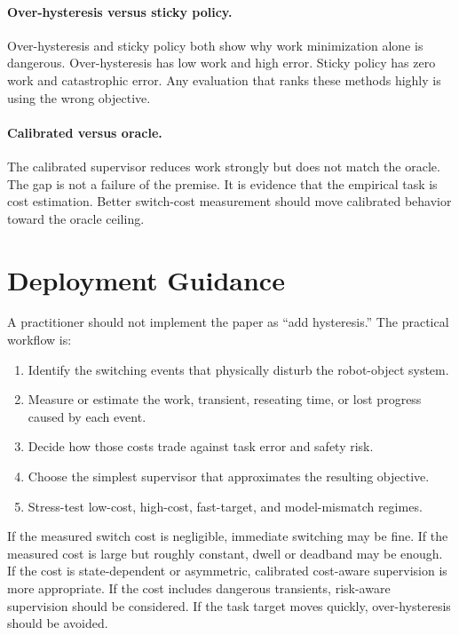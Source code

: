 \documentclass{article}
\begin{document}
\paragraph{Over-hysteresis versus sticky policy.}
Over-hysteresis and sticky policy both show why work minimization alone is dangerous.
Over-hysteresis has low work and high error.
Sticky policy has zero work and catastrophic error.
Any evaluation that ranks these methods highly is using the wrong objective.

\paragraph{Calibrated versus oracle.}
The calibrated supervisor reduces work strongly but does not match the oracle.
The gap is not a failure of the premise.
It is evidence that the empirical task is cost estimation.
Better switch-cost measurement should move calibrated behavior toward the oracle ceiling.

\section{Deployment Guidance}

A practitioner should not implement the paper as ``add hysteresis.''
The practical workflow is:

\begin{enumerate}
    \item Identify the switching events that physically disturb the robot-object system.
    \item Measure or estimate the work, transient, reseating time, or lost progress caused by each event.
    \item Decide how those costs trade against task error and safety risk.
    \item Choose the simplest supervisor that approximates the resulting objective.
    \item Stress-test low-cost, high-cost, fast-target, and model-mismatch regimes.
\end{enumerate}

If the measured switch cost is negligible, immediate switching may be fine.
If the measured cost is large but roughly constant, dwell or deadband may be enough.
If the cost is state-dependent or asymmetric, calibrated cost-aware supervision is more appropriate.
If the cost includes dangerous transients, risk-aware supervision should be considered.
If the task target moves quickly, over-hysteresis should be avoided.
\end{document}
